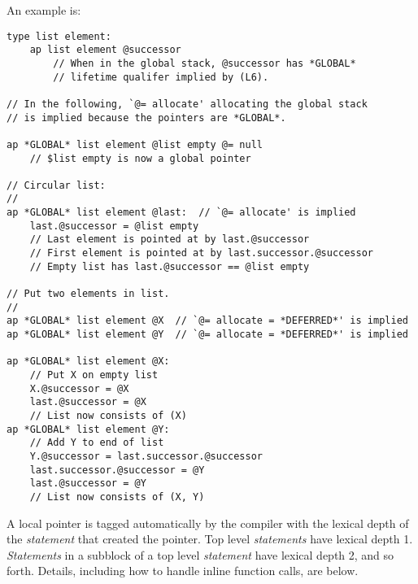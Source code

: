 \documentclass[12pt]{article}
\newenvironment{indpar}[1][0.3in]%
	{\begin{list}{}%
		     {\setlength{\itemsep}{0in}%
		      \setlength{\topsep}{0in}%
		      \setlength{\parsep}{1ex}%
		      \setlength{\labelwidth}{#1}%
		      \setlength{\leftmargin}{#1}%
		      \addtolength{\leftmargin}{\labelsep}}%
	 \item}%
	{\end{list}}
\begin{document}
An example is:
\begin{indpar}\begin{verbatim}
type list element:
    ap list element @successor
        // When in the global stack, @successor has *GLOBAL*
        // lifetime qualifer implied by (L6).

// In the following, `@= allocate' allocating the global stack
// is implied because the pointers are *GLOBAL*.

ap *GLOBAL* list element @list empty @= null
    // $list empty is now a global pointer

// Circular list:
//
ap *GLOBAL* list element @last:  // `@= allocate' is implied
    last.@successor = @list empty
    // Last element is pointed at by last.@successor
    // First element is pointed at by last.successor.@successor
    // Empty list has last.@successor == @list empty

// Put two elements in list.
//
ap *GLOBAL* list element @X  // `@= allocate = *DEFERRED*' is implied
ap *GLOBAL* list element @Y  // `@= allocate = *DEFERRED*' is implied

ap *GLOBAL* list element @X:
    // Put X on empty list
    X.@successor = @X
    last.@successor = @X
    // List now consists of (X)
ap *GLOBAL* list element @Y:
    // Add Y to end of list
    Y.@successor = last.successor.@successor
    last.successor.@successor = @Y
    last.@successor = @Y
    // List now consists of (X, Y)
\end{verbatim}\end{indpar}

A local pointer is tagged automatically by the compiler with the
lexical depth of the {\em statement} that created the pointer.  Top level
{\em statements} have lexical depth 1.  {\em Statements} in a subblock
of a top level {\em statement} have lexical depth 2, and so forth.
Details, including how to handle inline function calls, are below.
\end{document}
